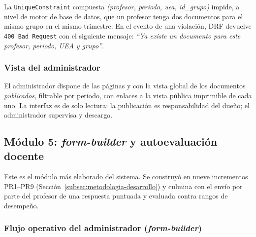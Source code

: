 La \texttt{UniqueConstraint} compuesta \emph{(profesor, periodo, uea, id\_grupo)} impide, a nivel de motor de base de datos, que un profesor tenga dos documentos para el mismo grupo en el mismo trimestre. En el evento de una violación, DRF devuelve \texttt{400 Bad Request} con el siguiente mensaje: \emph{``Ya existe un documento para este profesor, periodo, UEA y grupo''}.

\subsubsection{Vista del administrador}

El administrador dispone de las páginas  y  con la vista global de los documentos \emph{publicados}, filtrable por periodo, con enlaces a la vista pública imprimible de cada uno. La interfaz es de solo lectura: la publicación es responsabilidad del dueño; el administrador supervisa y descarga.

\subsection{Módulo 5: \emph{form-builder} y autoevaluación docente}

Este es el módulo más elaborado del sistema. Se construyó en nueve incrementos PR1--PR9 (Sección~\ref{subsec:metodologia-desarrollo}) y culmina con el envío por parte del profesor de una respuesta puntuada y evaluada contra rangos de desempeño.

\subsubsection{Flujo operativo del administrador (\emph{form-builder})}

